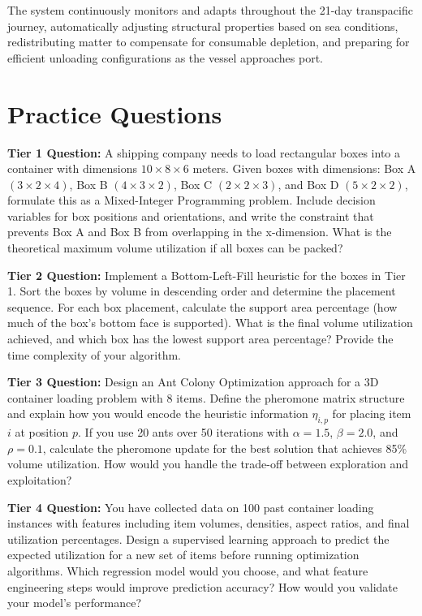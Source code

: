 \documentclass{article}
\begin{document}
The system continuously monitors and adapts throughout the 21-day transpacific journey, automatically adjusting structural properties based on sea conditions, redistributing matter to compensate for consumable depletion, and preparing for efficient unloading configurations as the vessel approaches port.

\section{Practice Questions}

\textbf{Tier 1 Question:} A shipping company needs to load rectangular boxes into a container with dimensions $10 \times 8 \times 6$ meters. Given boxes with dimensions: Box A $(3 \times 2 \times 4)$, Box B $(4 \times 3 \times 2)$, Box C $(2 \times 2 \times 3)$, and Box D $(5 \times 2 \times 2)$, formulate this as a Mixed-Integer Programming problem. Include decision variables for box positions and orientations, and write the constraint that prevents Box A and Box B from overlapping in the x-dimension. What is the theoretical maximum volume utilization if all boxes can be packed?

\textbf{Tier 2 Question:} Implement a Bottom-Left-Fill heuristic for the boxes in Tier 1. Sort the boxes by volume in descending order and determine the placement sequence. For each box placement, calculate the support area percentage (how much of the box's bottom face is supported). What is the final volume utilization achieved, and which box has the lowest support area percentage? Provide the time complexity of your algorithm.

\textbf{Tier 3 Question:} Design an Ant Colony Optimization approach for a 3D container loading problem with 8 items. Define the pheromone matrix structure and explain how you would encode the heuristic information $\eta_{i,p}$ for placing item $i$ at position $p$. If you use 20 ants over 50 iterations with $\alpha = 1.5$, $\beta = 2.0$, and $\rho = 0.1$, calculate the pheromone update for the best solution that achieves 85\% volume utilization. How would you handle the trade-off between exploration and exploitation?

\textbf{Tier 4 Question:} You have collected data on 100 past container loading instances with features including item volumes, densities, aspect ratios, and final utilization percentages. Design a supervised learning approach to predict the expected utilization for a new set of items before running optimization algorithms. Which regression model would you choose, and what feature engineering steps would improve prediction accuracy? How would you validate your model's performance?
\end{document}
